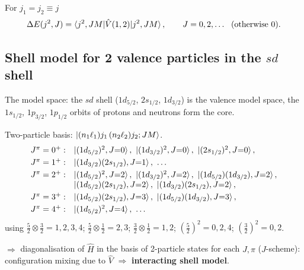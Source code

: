 \documentclass[11pt,a4paper]{article}
\newcommand{\op}[1]{\hat{#1}}
\begin{document}
For $j_1=j_2\equiv j$
\[
\Delta E(j^2,J)=\braket{j^2,JM|\op V(1,2)|j^2,JM},\qquad J=0,2,\dots\ \ (\text{otherwise }0).
\]

\subsection{Shell model for 2 valence particles in the \texorpdfstring{$sd$}{sd} shell}
The model space: the $sd$ shell ($1d_{5/2}$, $2s_{1/2}$, $1d_{3/2}$) is the valence model space, the $1s_{1/2}$, $1p_{3/2}$, $1p_{1/2}$ orbits of protons and neutrons form the core.
\begin{center}
\end{center}
Two-particle basis: $\ket{(n_1\ell_1)j_1\,(n_2\ell_2)j_2;JM}$.
\[
\begin{array}{ll}
J^\pi=0^+: & \ket{(1d_{5/2})^2,J{=}0},\ \ket{(1d_{3/2})^2,J{=}0},\ \ket{(2s_{1/2})^2,J{=}0},\\[1mm]
J^\pi=1^+: & \ket{(1d_{3/2})(2s_{1/2}),J{=}1},\ \dots\\[1mm]
J^\pi=2^+: & \ket{(1d_{5/2})^2,J{=}2},\ \ket{(1d_{3/2})^2,J{=}2},\ \ket{(1d_{5/2})(1d_{3/2}),J{=}2},\\
           & \ket{(1d_{5/2})(2s_{1/2}),J{=}2},\ \ket{(1d_{3/2})(2s_{1/2}),J{=}2},\\[1mm]
J^\pi=3^+: & \ket{(1d_{5/2})(2s_{1/2}),J{=}3},\ \ket{(1d_{5/2})(1d_{3/2}),J{=}3},\\[1mm]
J^\pi=4^+: & \ket{(1d_{5/2})^2,J{=}4},\ \dots
\end{array}
\]
using $\frac52\otimes\frac32=1,2,3,4$; $\frac52\otimes\frac12=2,3$; $\frac32\otimes\frac12=1,2$; $(\frac52)^2=0,2,4$; $(\frac32)^2=0,2$.

$\Rightarrow$ diagonalisation of $\op H$ in the basis of 2-particle states for each $J,\pi$ ($J$-scheme): configuration mixing due to $\op V$ $\Rightarrow$ \textbf{interacting shell model}.
\end{document}
